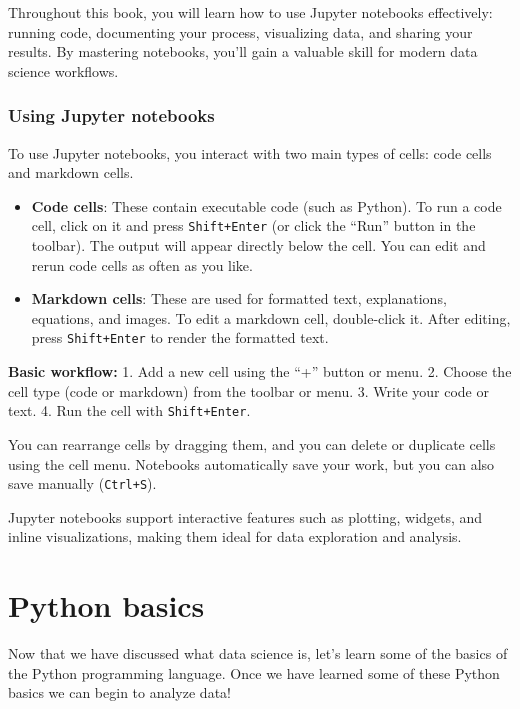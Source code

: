 \documentclass[
  letterpaper,
  DIV=11,
  numbers=noendperiod]{scrreprt}
\begin{document}
Throughout this book, you will learn how to use Jupyter notebooks
effectively: running code, documenting your process, visualizing data,
and sharing your results. By mastering notebooks, you'll gain a valuable
skill for modern data science workflows.

\subsection{Using Jupyter notebooks}\label{using-jupyter-notebooks}

To use Jupyter notebooks, you interact with two main types of cells:
code cells and markdown cells.

\begin{itemize}
\item
  \textbf{Code cells}: These contain executable code (such as Python).
  To run a code cell, click on it and press \texttt{Shift+Enter} (or
  click the ``Run'' button in the toolbar). The output will appear
  directly below the cell. You can edit and rerun code cells as often as
  you like.
\item
  \textbf{Markdown cells}: These are used for formatted text,
  explanations, equations, and images. To edit a markdown cell,
  double-click it. After editing, press \texttt{Shift+Enter} to render
  the formatted text.
\end{itemize}

\textbf{Basic workflow:} 1. Add a new cell using the ``+'' button or
menu. 2. Choose the cell type (code or markdown) from the toolbar or
menu. 3. Write your code or text. 4. Run the cell with
\texttt{Shift+Enter}.

You can rearrange cells by dragging them, and you can delete or
duplicate cells using the cell menu. Notebooks automatically save your
work, but you can also save manually (\texttt{Ctrl+S}).

Jupyter notebooks support interactive features such as plotting,
widgets, and inline visualizations, making them ideal for data
exploration and analysis.


\chapter{Python basics}\label{python-basics}

Now that we have discussed what data science is, let's learn some of the
basics of the Python programming language. Once we have learned some of
these Python basics we can begin to analyze data!
\end{document}
